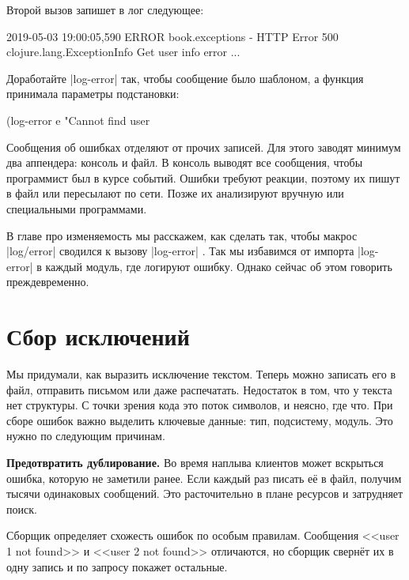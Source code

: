 \noindent
Второй вызов запишет в лог следующее:

\begin{english}
  \begin{text}
2019-05-03 19:00:05,590 ERROR book.exceptions - HTTP Error 500
clojure.lang.ExceptionInfo
  Get user info error
  ...
  \end{text}
\end{english}

Доработайте \spverb|log-error| так, чтобы сообщение было шаблоном, а функция
принимала параметры подстановки:

\begin{english}
  \begin{clojure}
(log-error e "Cannot find user %
  \end{clojure}
\end{english}

Сообщения об ошибках отделяют от прочих записей. Для этого заводят минимум два
аппендера: консоль и файл. В консоль выводят все сообщения, чтобы программист
был в курсе событий. Ошибки требуют реакции, поэтому их пишут в файл или
пересылают по сети. Позже их анализируют вручную или специальными программами.

В главе про изменяемость мы расскажем, как сделать так, чтобы макрос
\spverb|log/error| сводился к вызову \spverb|log-error| .
Так мы избавимся от импорта \spverb|log-error| в каждый модуль, где логируют ошибку.
Однако сейчас об этом говорить преждевременно.

\section{Сбор исключений}


Мы придумали, как выразить исключение текстом. Теперь можно записать его в файл,
отправить письмом или даже распечатать. Недостаток в том, что у текста нет
структуры. С точки зрения кода это поток символов, и неясно, где что. При сборе
ошибок важно выделить ключевые данные: тип, подсистему, модуль. Это нужно по
следующим причинам.

\textbf{Предотвратить дублирование.} Во время наплыва клиентов может вскрыться
ошибка, которую не заметили ранее. Если каждый раз писать е\"{е} в файл, получим
тысячи одинаковых сообщений. Это расточительно в плане ресурсов и затрудняет
поиск.

Сборщик определяет схожесть ошибок по особым правилам. Сообщения <<user 1 not
found>> и <<user 2 not found>> отличаются, но сборщик сверн\"{е}т их в одну
запись и по запросу покажет остальные.

